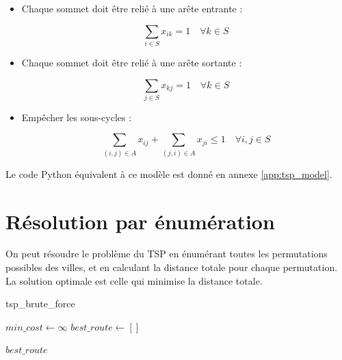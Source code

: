 \begin{itemize}
    \item Chaque sommet doit être relié à une arête entrante :
    
    \begin{equation}
        \sum_{i \in S} x_{ik} = 1 \quad \forall k \in S
    \end{equation}
        

    \item Chaque sommet doit être relié à une arête sortante :
    
    \begin{equation}
        \sum_{j \in S} x_{kj} = 1 \quad \forall k \in S
    \end{equation}

    \item Empêcher les sous-cycles :
    
    \begin{equation}
        \sum_{(i,j) \in A} x_{ij} + \sum_{(j,i) \in A} x_{ji} \leq 1 \quad \forall i,j \in S
    \end{equation}
\end{itemize}

Le code Python équivalent à ce modèle est donné en annexe \ref{app:tsp_model}.

\section{Résolution par énumération}

On peut résoudre le problème du TSP en énumérant toutes les permutations possibles des villes, et en calculant la distance totale pour chaque permutation. La solution optimale est celle qui minimise la distance totale.

\begin{algorithm}[H]
    \caption{tsp\_brute\_force}\label{alg:tsp_enum}

    $min\_cost \gets \infty$\;
    $best\_route \gets []$\;

    \Return $best\_route$\;

\end{algorithm}

